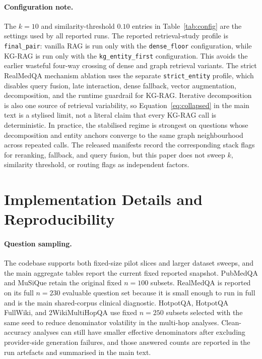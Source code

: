 \paragraph{Configuration note.}
The $k=10$ and similarity-threshold $0.10$ entries in
Table~\ref{tab:config} are the settings used by all reported runs.
The reported retrieval-study profile is \texttt{final\_pair}: vanilla RAG
is run only with the \texttt{dense\_floor} configuration, while KG-RAG is run
only with the \texttt{kg\_entity\_first} configuration.
This avoids the earlier wasteful four-way crossing of dense and graph
retrieval variants.
The strict RealMedQA mechanism ablation uses the separate
\texttt{strict\_entity} profile, which disables query fusion, late
interaction, dense fallback, vector augmentation, decomposition, and the
runtime guardrail for KG-RAG.
Iterative decomposition is also one source of retrieval variability, so
Equation~\eqref{eq:collapsed} in the main text is a stylised limit, not a
literal claim that every KG-RAG call is deterministic.
In practice, the stabilised regime is strongest on questions whose
decomposition and entity anchors converge to the same graph neighbourhood
across repeated calls.
The released manifests record the corresponding stack flags for reranking,
fallback, and query fusion, but this paper does not sweep $k$, similarity
threshold, or routing flags as independent factors.

\section{Implementation Details and Reproducibility}
\label{sec:appendix_reproducibility}

\paragraph{Question sampling.}
The codebase supports both fixed-size pilot slices and larger dataset sweeps,
and the main aggregate tables report the current fixed reported snapshot.
PubMedQA and MuSiQue retain the original fixed $n=100$ subsets.
RealMedQA is reported on its full $n=230$ evaluable question set because it is
small enough to run in full and is the main shared-corpus clinical diagnostic.
HotpotQA, HotpotQA FullWiki, and 2WikiMultiHopQA use fixed $n=250$ subsets
selected with the same seed to reduce denominator volatility in the multi-hop
analyses.
Clean-accuracy analyses can still have smaller effective denominators after
excluding provider-side generation failures, and those answered counts are
reported in the run artefacts and summarised in the main text.

